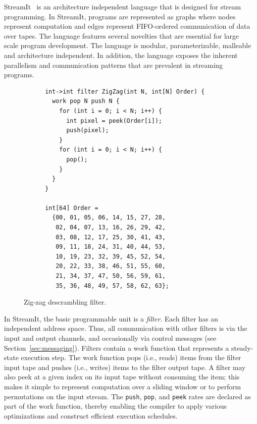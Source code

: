 \label{sec:streamit}

StreamIt~\cite{streamitcc} is an architecture independent language
that is designed for stream programming. In StreamIt, programs are
represented as graphs where nodes represent computation and edges
represent FIFO-ordered communication of data over tapes. The language
features several novelties that are essential for large scale program
development. The language is modular, parameterizable, malleable and
architecture independent. In addition, the language exposes the
inherent parallelism and communication patterns that are prevalent in
streaming programs.

\begin{figure}[t]
  \begin{scriptsize}
	\begin{verbatim}
	  int->int filter ZigZag(int N, int[N] Order) {
	    work pop N push N {
	      for (int i = 0; i < N; i++) {
	        int pixel = peek(Order[i]);
	        push(pixel);
	      }
	      for (int i = 0; i < N; i++) {
	        pop();
	      }
	    }
	  }

	  int[64] Order =
	    {00, 01, 05, 06, 14, 15, 27, 28,
	     02, 04, 07, 13, 16, 26, 29, 42,
	     03, 08, 12, 17, 25, 30, 41, 43,
	     09, 11, 18, 24, 31, 40, 44, 53,
	     10, 19, 23, 32, 39, 45, 52, 54,
	     20, 22, 33, 38, 46, 51, 55, 60,
	     21, 34, 37, 47, 50, 56, 59, 61,
	     35, 36, 48, 49, 57, 58, 62, 63};
	\end{verbatim}
  \end{scriptsize}
  \caption{Zig-zag descrambling filter.}
  \label{fig:zigzag-filter}
\end{figure}

In StreamIt, the basic programmable unit is a {\it filter}.  Each
filter has an independent address space. Thus, all communication with
other filters is via the input and output channels, and occasionally
via control messages (see Section~\ref{sec:messaging}).  Filters
contain a work function that represents a steady-state execution step.
The work function pops (i.e., reads) items from the filter input tape
and pushes (i.e., writes) items to the filter output tape. A filter
may also peek at a given index on its input tape without consuming the
item; this makes it simple to represent computation over a sliding
window or to perform permutations on the input stream. The {\tt push},
{\tt pop}, and {\tt peek} rates are declared as part of the work
function, thereby enabling the compiler to apply various optimizations
and construct efficient execution schedules.

